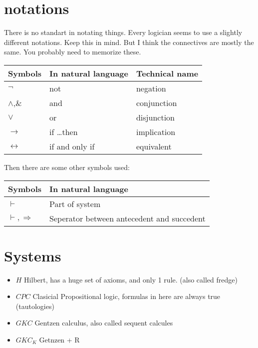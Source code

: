 \documentclass{article}
\begin{document}
\section{notations}
\label{notations}
There is no standart in notating things. Every logician seems to use a
slightly different notations. Keep this in mind. But I think the connectives
are mostly the same. You probably need to memorize these.

\noindent
\begin{tabular}{@{}lll@{}}
Symbols&
In natural language &
Technical name \\ \toprule
$\neg$ 			& not 				& negation \\
$\wedge$,\& 	& and 				& conjunction \\
$\vee$ 			& or 				& disjunction\\
$\to$	& if \ldots then 	& implication\\
$\leftrightarrow$	& if and only if 	& equivalent\\ \bottomrule
\end{tabular}


Then there are some other symbols used:

\noindent
\begin{tabular}{@{}ll@{}}
Symbols&
In natural language \\ \toprule
$\vdash$ 					& Part of system \\
$\vdash, \Rightarrow$ 		& Seperator between antecedent and succedent\\ \bottomrule
\end{tabular}


\section{Systems}
\begin{itemize}
	\item $H$  Hilbert, has a huge set of axioms, and only 1 rule. (also called fredge)
	\item $CPC$ Clasicial Propositional logic, formulas in here are always true
(tautologies)
	\item $GKC$ Gentzen calculus, also called sequent calcules
	\item $GKC_K$  Getnzen + R 
\end{itemize}
\end{document}

